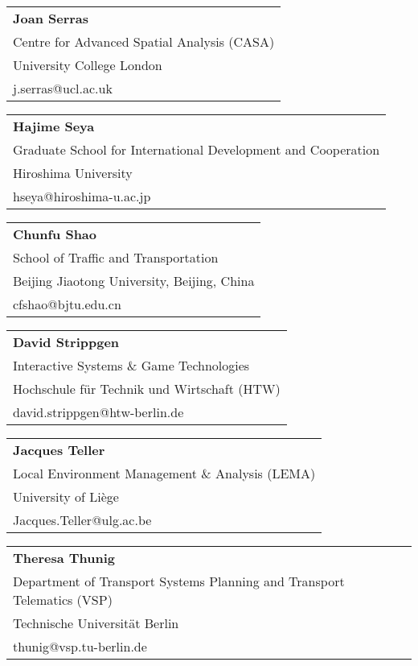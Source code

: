 \begin{tabular}[width=0.48\textwidth]{@{}l}
\textbf{Joan Serras} \\
Centre for Advanced Spatial Analysis (CASA) \\
University College London \\
j.serras@ucl.ac.uk \\
\end{tabular}

\begin{tabular}[width=0.48\textwidth]{@{}l}
\textbf{Hajime Seya} \\
Graduate School for International Development and Cooperation \\
Hiroshima University \\
hseya@hiroshima-u.ac.jp  \\
\end{tabular}

\begin{tabular}[width=0.48\textwidth]{@{}l}
\textbf{Chunfu Shao} \\
School of Traffic and Transportation \\
Beijing Jiaotong University, Beijing, China \\
cfshao@bjtu.edu.cn \\
\end{tabular}

\begin{tabular}[width=0.48\textwidth]{@{}l}
\textbf{David Strippgen} \\
Interactive Systems \& Game Technologies \\
Hochschule für Technik und Wirtschaft (HTW) \\
david.strippgen@htw-berlin.de \\
\end{tabular}

\begin{tabular}[width=0.48\textwidth]{@{}l}
\textbf{Jacques Teller} \\
Local Environment Management \& Analysis (LEMA) \\
University of Liège \\
Jacques.Teller@ulg.ac.be \\
\end{tabular}

\begin{tabular}[width=0.48\textwidth]{@{}l}
\textbf{Theresa Thunig} \\
Department of Transport Systems Planning and Transport Telematics (VSP) \\
Technische Universität Berlin \\
thunig@vsp.tu-berlin.de \\
\end{tabular}

